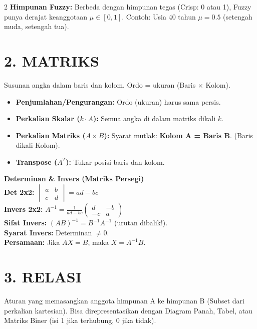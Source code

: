 \documentclass[9pt,a4paper]{extarticle}
\begin{document}
\begin{multicols}{2}
\textbf{Himpunan Fuzzy:} Berbeda dengan himpunan tegas (Crisp: 0 atau 1), Fuzzy punya derajat keanggotaan \(\mu \in [0,1]\). Contoh: Usia 40 tahun \(\mu=0.5\) (setengah muda, setengah tua).

\section*{2. MATRIKS}
Susunan angka dalam baris dan kolom. Ordo = ukuran (Baris \(\times\) Kolom).
\begin{itemize}
    \item \textbf{Penjumlahan/Pengurangan:} Ordo (ukuran) harus sama persis.
    \item \textbf{Perkalian Skalar (\(k \cdot A\)):} Semua angka di dalam matriks dikali \(k\).
    \item \textbf{Perkalian Matriks (\(A \times B\)):} Syarat mutlak: \textbf{Kolom A = Baris B}. (Baris dikali Kolom).
    \item \textbf{Transpose (\(A^T\)):} Tukar posisi baris dan kolom.
\end{itemize}

\begin{rumusbox}
\textbf{\textcolor{blue!70!black}{Determinan \& Invers (Matriks Persegi)}} \\
\textbf{Det 2x2:} \(\begin{vmatrix} a & b \\ c & d \end{vmatrix} = ad - bc\) \\
\textbf{Invers 2x2:} \(A^{-1} = \frac{1}{ad-bc} \begin{pmatrix} d & -b \\ -c & a \end{pmatrix}\) \\
\textbf{Sifat Invers:} \((AB)^{-1} = B^{-1} A^{-1}\) (urutan dibalik!). \\
\textbf{Syarat Invers:} Determinan \(\neq 0\). \\
\textbf{Persamaan:} Jika \(AX = B\), maka \(X = A^{-1} B\).
\end{rumusbox}

\section*{3. RELASI}
Aturan yang memasangkan anggota himpunan A ke himpunan B (Subset dari perkalian kartesian). Bisa direpresentasikan dengan Diagram Panah, Tabel, atau Matriks Biner (isi 1 jika terhubung, 0 jika tidak).


\end{multicols}
\end{document}
